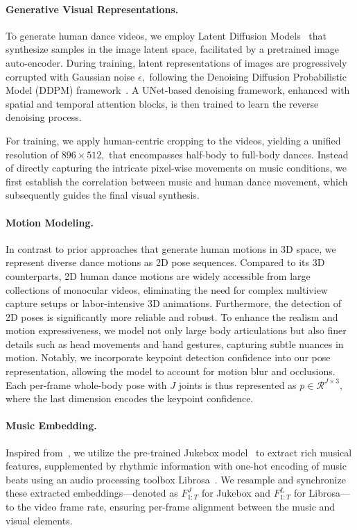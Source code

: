 \paragraph{Generative Visual Representations.} To generate human dance videos, we employ Latent Diffusion Models~\cite{rombach2022high} that synthesize
samples in the image latent space, facilitated by a pretrained image auto-encoder.  During training, latent representations of images are progressively corrupted with Gaussian noise $\epsilon,$ following the Denoising Diffusion Probabilistic Model (DDPM) framework~\cite{ho2020denoising,song2020score}. A UNet-based denoising framework, enhanced with spatial and temporal attention blocks, is then trained to learn the reverse denoising process. 

For training, we apply human-centric cropping to the videos, yielding a unified resolution of $896\times512,$ that encompasses half-body to full-body dances. Instead of directly capturing the intricate pixel-wise movements on music conditions, we first establish the correlation between music and human dance movement, which subsequently guides the final visual synthesis. 
\vspace{-4mm}
\paragraph{Motion Modeling.} In contrast to prior approaches that generate human motions in 3D space, we represent diverse dance motions as 2D pose sequences. Compared to its 3D counterparts, 2D human dance motions are widely accessible from large collections of monocular videos, eliminating the need for complex multiview capture setups or labor-intensive 3D animations. Furthermore, the detection of 2D poses is significantly more reliable and robust. To enhance the realism and motion expressiveness, 
we model not only large body articulations but also finer details such as head movements and hand gestures, capturing subtle nuances in motion. Notably, we incorporate keypoint detection confidence into our pose representation, allowing the model to account for motion blur and occlusions.  Each per-frame whole-body pose with $J$ joints is thus represented as $p \in \mathcal{R}^{J\times 3},$ where the last dimension encodes the keypoint confidence. 

\vspace{-4mm}
\paragraph{Music Embedding.}  Inspired from~\cite{edge}, we utilize the pre-trained Jukebox model~\cite{dhariwal2020jukebox} to extract rich musical features, supplemented by rhythmic information with one-hot encoding of music beats using an audio processing toolbox Librosa~\cite{jin2017towards}.  We resample and synchronize these extracted embeddings—denoted as $F^{J}_{1:T}$ for Jukebox and $F^{L}_{1:T}$ for Librosa—to the video frame rate, ensuring per-frame alignment between the music and visual elements. 


